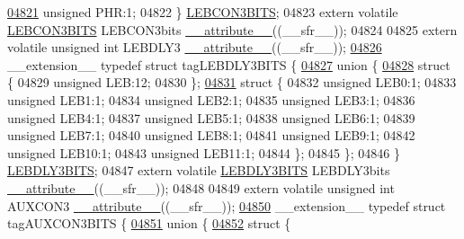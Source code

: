 \begin{DoxyCode}
\hypertarget{a00009_source_l04821}{}\hyperlink{a00008_ae02a9c6926c3a1feac21cec18a520e4a}{04821}   \textcolor{keywordtype}{unsigned} PHR:1;
04822 \} \hyperlink{a00008_d6/d06/a00572}{LEBCON3BITS};
04823 \textcolor{keyword}{extern} \textcolor{keyword}{volatile} \hyperlink{a00008_d6/d06/a00572}{LEBCON3BITS} LEBCON3bits \hyperlink{a00009_a493c46f03454991ccc5aa7a6e1dfb2a7}{\_\_attribute\_\_}((\_\_sfr\_\_));
04824 
04825 \textcolor{keyword}{extern} \textcolor{keyword}{volatile} \textcolor{keywordtype}{unsigned} \textcolor{keywordtype}{int}  LEBDLY3 \hyperlink{a00009_a493c46f03454991ccc5aa7a6e1dfb2a7}{\_\_attribute\_\_}((\_\_sfr\_\_));
\hypertarget{a00009_source_l04826}{}\hyperlink{a00008}{04826} \_\_extension\_\_ \textcolor{keyword}{typedef} \textcolor{keyword}{struct }tagLEBDLY3BITS \{
\hypertarget{a00009_source_l04827}{}\hyperlink{a00009}{04827}   \textcolor{keyword}{union }\{
\hypertarget{a00009_source_l04828}{}\hyperlink{a00009}{04828}     \textcolor{keyword}{struct }\{
04829       \textcolor{keywordtype}{unsigned} LEB:12;
04830     \};
\hypertarget{a00009_source_l04831}{}\hyperlink{a00009}{04831}     \textcolor{keyword}{struct }\{
04832       \textcolor{keywordtype}{unsigned} LEB0:1;
04833       \textcolor{keywordtype}{unsigned} LEB1:1;
04834       \textcolor{keywordtype}{unsigned} LEB2:1;
04835       \textcolor{keywordtype}{unsigned} LEB3:1;
04836       \textcolor{keywordtype}{unsigned} LEB4:1;
04837       \textcolor{keywordtype}{unsigned} LEB5:1;
04838       \textcolor{keywordtype}{unsigned} LEB6:1;
04839       \textcolor{keywordtype}{unsigned} LEB7:1;
04840       \textcolor{keywordtype}{unsigned} LEB8:1;
04841       \textcolor{keywordtype}{unsigned} LEB9:1;
04842       \textcolor{keywordtype}{unsigned} LEB10:1;
04843       \textcolor{keywordtype}{unsigned} LEB11:1;
04844     \};
04845   \};
04846 \} \hyperlink{a00008_dc/d4a/a00579}{LEBDLY3BITS};
04847 \textcolor{keyword}{extern} \textcolor{keyword}{volatile} \hyperlink{a00008_dc/d4a/a00579}{LEBDLY3BITS} LEBDLY3bits \hyperlink{a00009_a493c46f03454991ccc5aa7a6e1dfb2a7}{\_\_attribute\_\_}((\_\_sfr\_\_));
04848 
04849 \textcolor{keyword}{extern} \textcolor{keyword}{volatile} \textcolor{keywordtype}{unsigned} \textcolor{keywordtype}{int}  AUXCON3 \hyperlink{a00009_a493c46f03454991ccc5aa7a6e1dfb2a7}{\_\_attribute\_\_}((\_\_sfr\_\_));
\hypertarget{a00009_source_l04850}{}\hyperlink{a00008}{04850} \_\_extension\_\_ \textcolor{keyword}{typedef} \textcolor{keyword}{struct }tagAUXCON3BITS \{
\hypertarget{a00009_source_l04851}{}\hyperlink{a00009}{04851}   \textcolor{keyword}{union }\{
\hypertarget{a00009_source_l04852}{}\hyperlink{a00009}{04852}     \textcolor{keyword}{struct }\{

\end{DoxyCode}
